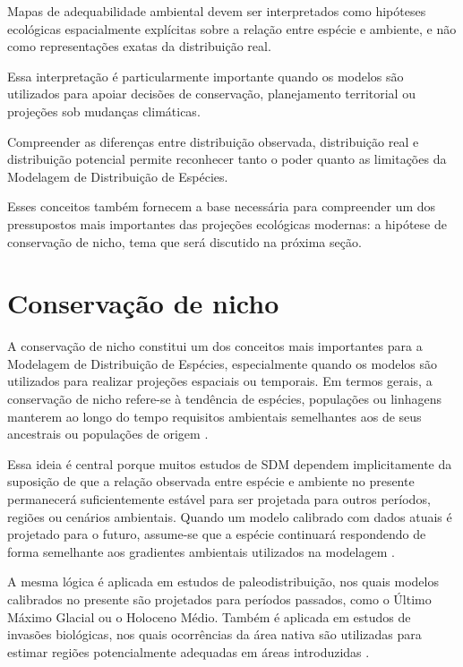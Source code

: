 \begin{atencao}
	Mapas de adequabilidade ambiental devem ser interpretados como hipóteses ecológicas espacialmente explícitas sobre a relação entre espécie e ambiente, e não como representações exatas da distribuição real.
\end{atencao}

Essa interpretação é particularmente importante quando os modelos são utilizados para apoiar decisões de conservação, planejamento territorial ou projeções sob mudanças climáticas.

Compreender as diferenças entre distribuição observada, distribuição real e distribuição potencial permite reconhecer tanto o poder quanto as limitações da Modelagem de Distribuição de Espécies.

Esses conceitos também fornecem a base necessária para compreender um dos pressupostos mais importantes das projeções ecológicas modernas: a hipótese de conservação de nicho, tema que será discutido na próxima seção.

\section{Conservação de nicho}

A conservação de nicho constitui um dos conceitos mais importantes para a Modelagem de Distribuição de Espécies, especialmente quando os modelos são utilizados para realizar projeções espaciais ou temporais. Em termos gerais, a conservação de nicho refere-se à tendência de espécies, populações ou linhagens manterem ao longo do tempo requisitos ambientais semelhantes aos de seus ancestrais ou populações de origem \parencite{peterson1999,wiens2010}.

Essa ideia é central porque muitos estudos de SDM dependem implicitamente da suposição de que a relação observada entre espécie e ambiente no presente permanecerá suficientemente estável para ser projetada para outros períodos, regiões ou cenários ambientais. Quando um modelo calibrado com dados atuais é projetado para o futuro, assume-se que a espécie continuará respondendo de forma semelhante aos gradientes ambientais utilizados na modelagem \parencite{peterson2011}.

A mesma lógica é aplicada em estudos de paleodistribuição, nos quais modelos calibrados no presente são projetados para períodos passados, como o Último Máximo Glacial ou o Holoceno Médio. Também é aplicada em estudos de invasões biológicas, nos quais ocorrências da área nativa são utilizadas para estimar regiões potencialmente adequadas em áreas introduzidas \parencite{guisan2017habitat}.

